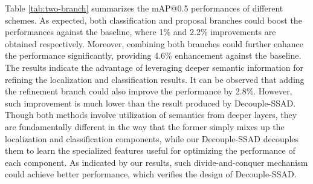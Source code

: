 \documentclass{article}
\begin{document}
Table \ref{tab:two-branch} summarizes the mAP@0.5 performances of different schemes.
As expected, both classification and proposal branches could boost the performances against the baseline, where 1\% and 2.2\% improvements are obtained respectively.
Moreover, combining both branches could further enhance the performance significantly, providing 4.6\% enhancement against the baseline.
The results indicate the advantage of leveraging deeper semantic information for refining the localization and classification results. 
It can be observed that adding the refinement branch could also improve the performance by 2.8\%. However, such improvement is much lower than the result produced by Decouple-SSAD.
Though both methods involve utilization of semantics from deeper layers, they are fundamentally different in the way that the former simply mixes up the localization and classification components, while our Decouple-SSAD decouples them to learn the specialized features useful for optimizing the performance of each component.
As indicated by our results, such divide-and-conquer mechanism could achieve better performance, which verifies the design of Decouple-SSAD.
\end{document}
